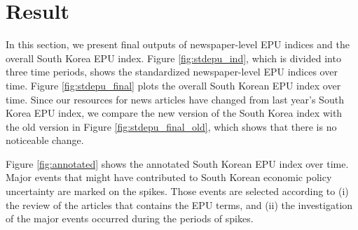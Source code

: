 \section{Result}
In this section, we present final outputs of newspaper-level EPU indices and the overall South Korea EPU index. Figure \ref{fig:stdepu_ind}, which is divided into three time periods, shows the standardized newspaper-level EPU indices over time. Figure \ref{fig:stdepu_final} plots the overall South Korean EPU index over time. Since our resources for news articles have changed from last year's South Korea EPU index, we compare the new version of the South Korea index with the old version in Figure \ref{fig:stdepu_final_old}, which shows that there is no noticeable change. 

Figure \ref{fig:annotated} shows the annotated South Korean EPU index over time. Major events that might have contributed to South Korean economic policy uncertainty are marked on the spikes. Those events are selected according to (i) the review of the articles that contains the EPU terms, and (ii) the investigation of the major events occurred during the periods of spikes. 

